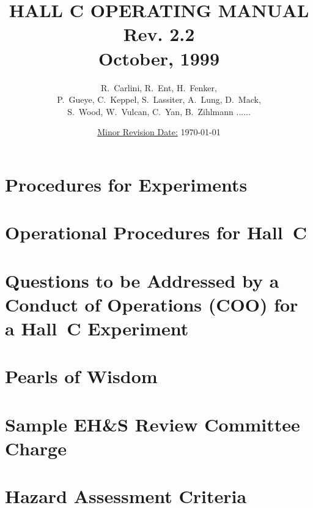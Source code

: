 \documentclass[12pt]{book}
\title{HALL C OPERATING MANUAL \\ Rev. 2.2 \\ October, 1999}
\author{R.~Carlini, R.~Ent, H.~Fenker,\\
P.~Gueye, C.~Keppel, S.~Lassiter, A.~Lung, D.~Mack,\\ 
S.~Wood, W.~Vulcan, C.~Yan, B.~Zihlmann ......}
\date{\underline{Minor Revision Date:} \today}
\begin{document}
\setcounter{tocdepth}{4}
\maketitle
{
\setcounter{page}{1}
\tableofcontents
\listoffigures
\listoftables
}
\clearpage
{}
\setcounter{page}{1}


\chapter{Procedures for Experiments }
\label{chapt:proc}


\chapter{Operational Procedures for Hall~C}
\label{chapt:osp}


%

%

%
%
\appendix
\chapter{Questions to be Addressed by a Conduct of Operations (COO) for a Hall~C 
Experiment}
\label{app:questions}


\chapter{Pearls of Wisdom}
\label{app:pearls}



\chapter{Sample EH\&S Review Committee Charge}
\label{app:charge}


\chapter{Hazard Assessment Criteria}
\label{app:criteria}

\end{document}
